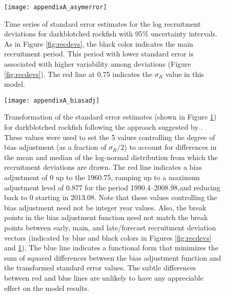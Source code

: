 \begin{figure}[H]
	\begin{center}
		\texttt{[image: appendixA\_asymerror]}\\
	\end{center}
	\caption{Time series of standard error estimates for the log recruitment deviations for darkblotched rockfish with 95\% uncertainty intervals. As in Figure \ref{fig:recdevs}, the black color indicates the main recruitment period. This period with lower standard error is associated with higher variability among deviations (Figure \ref{fig:recdevs}). The red line at 0.75 indicates the  $\sigma_R$ value in this model.}
	\label{fig:recSE}
\end{figure}


\begin{figure}[H]
	\begin{center}
		\texttt{[image: appendixA\_biasadj]}\\
	\end{center}
	\caption{Transformation of the standard error estimates (shown in Figure \ref{fig:recSE}) for darkblotched rockfish following the approach suggested by \citet{methot-adjusting-2011}. These values were used to set the 5 values controlling the degree of bias adjustment (as a fraction of  $\sigma_R/2$) to account for differences in the mean and median of the log-normal distribution from which the recruitment deviations are drawn. The red line indicates a bias adjustment of 0 up to the 1960.75, ramping up to a maximum adjustment level of 0.877 for the period 1990.4--2008.98,and reducing back to 0 starting in 2013.08. Note that these values controlling the bias adjustment need not be integer year values. Also, the break points in the bias adjustment function need not match the break points between early, main, and late/forecast recruitment deviation vectors (indicated by blue and black colors in Figures \ref{fig:recdevs} and \ref{fig:recSE}). The blue line indicates a functional form that minimizes the sum of squared differences between the bias adjustment function and the transformed standard error values. The subtle differences between red and blue lines are unlikely to have any appreciable effect on the model results.}
	\label{fig:ramp}
\end{figure}


